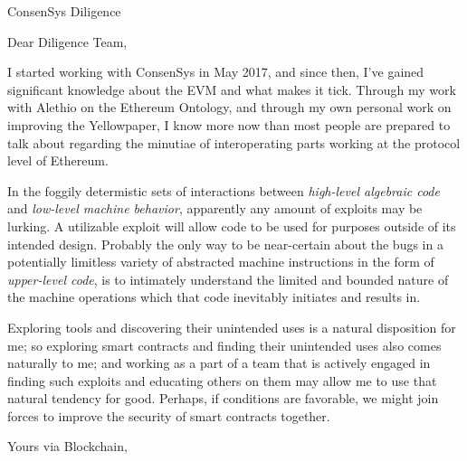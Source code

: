 \documentclass[
	pagenumber=false, %
	parskip=half, %
	fromalign=right, %
	foldmarks=true, %
	addrfield=false ]{scrlttr2}
\date{\today} %
\begin{document}
 
\begin{letter}{ConsenSys Diligence} %


\opening{Dear Diligence Team,}

	I started working with ConsenSys in May 2017, and since then, I've gained significant knowledge about the EVM and what makes it tick. Through my work with Alethio on the Ethereum Ontology, and through my own personal work on improving the Yellowpaper, I know more now than most people are prepared to talk about regarding the minutiae of interoperating parts working at the protocol level of Ethereum. 

	In the foggily determistic sets of interactions between \textit{high-level algebraic code} and \textit{low-level machine behavior}, apparently any amount of exploits may be lurking. A utilizable exploit will allow code to be used for purposes outside of its intended design. Probably the only way to be near-certain about the bugs in a potentially limitless variety of abstracted machine instructions in the form of \textit{upper-level code}, is to intimately understand the limited and bounded nature of the machine operations which that code inevitably initiates and results in. 
	
	 Exploring tools and discovering their unintended uses is a natural disposition for me; so exploring smart contracts and finding their unintended uses also comes naturally to me; and working as a part of a team that is actively engaged in finding such exploits and educating others on them may allow me to use that natural tendency for good. Perhaps, if conditions are favorable, we might join forces to improve the security of smart contracts together.

\closing{Yours via Blockchain,}



\end{letter}
 
\end{document}
